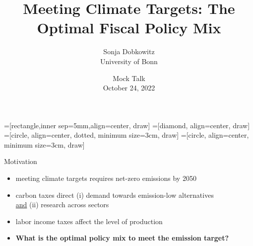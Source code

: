 \documentclass[11pt,aspectratio=169]{beamer}
\author[Sonja Dobkowitz]{\small Sonja Dobkowitz\\ \footnotesize{University of Bonn%
}\\ }
\title{Meeting Climate Targets: The Optimal Fiscal Policy Mix}
\date{\small{Mock Talk\\ October 24, 2022 }}
\begin{document}
=[rectangle,inner sep=5mm,align=center, draw]
=[diamond, align=center, draw]
=[circle, align=center, dotted, minimum size=3cm, draw]
=[circle, align=center, minimum size=3cm, draw]
{
	\begin{frame}
		\titlepage
	\end{frame}
}



\addtocounter{framenumber}{-1}
\begin{frame}{Motivation}
	
	\begin{itemize}[<+-| alert@+>]
		\item meeting climate targets requires net-zero emissions by 2050 \citep{IPCC2022}
		\vspace{3mm}
		\item carbon taxes  direct  (i) demand towards emission-low alternatives\\ \hspace{23mm} \underline{and} (ii) research across sectors
		\vspace{3mm}
		\item labor income taxes affect the level of production 
		\vspace{3mm}
		\item \textbf{What is the optimal policy mix to meet the emission target?}
	\end{itemize}
\end{frame}
\end{document}
